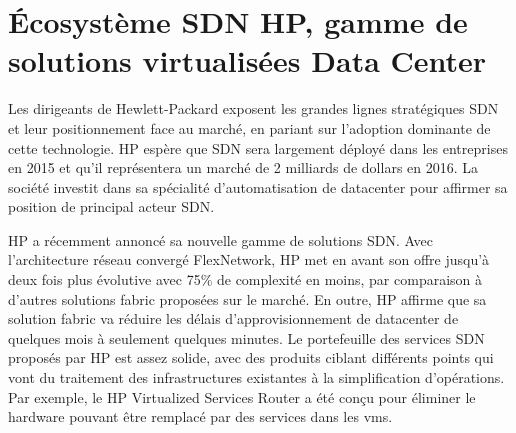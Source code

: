 

\section{Écosystème SDN HP, gamme de solutions virtualisées Data Center}


Les dirigeants de Hewlett-Packard exposent les grandes lignes stratégiques SDN et leur positionnement face au marché, en pariant sur l'adoption dominante de cette technologie. HP espère que SDN sera largement déployé dans les entreprises en 2015 et qu'il représentera un marché de 2 milliards de dollars en 2016. La société investit dans sa spécialité d'automatisation de \gls{datacenter} pour affirmer sa position de principal acteur SDN. \cite{ExecutiveGuideToSDNHP}


HP a récemment annoncé sa nouvelle gamme de solutions SDN. Avec l'architecture réseau convergé FlexNetwork, HP met en avant son offre jusqu'à deux fois plus évolutive avec 75\% de complexité en moins, par comparaison à d'autres solutions \gls{fabric} proposées sur le marché. En outre, HP affirme que sa solution \gls{fabric} va réduire les délais d’approvisionnement de \gls{datacenter} de quelques mois à seulement quelques minutes. Le portefeuille des services SDN proposés par HP est assez solide, avec des produits ciblant différents points qui vont du traitement des infrastructures existantes à la simplification d'opérations. Par exemple, le HP Virtualized Services Router a été conçu pour éliminer le hardware pouvant être remplacé par des services dans les \glspl{vm}.  




